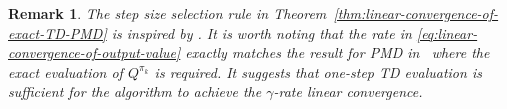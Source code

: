 \documentclass[10pt]{article}
\theoremstyle{plain}
\newtheorem{remark}{Remark}[section]
\theoremstyle{definition}
\begin{document}
\begin{remark}
The step size selection rule in Theorem~\ref{thm:linear-convergence-of-exact-TD-PMD} is inspired by  \textup{\cite{Johnson_Pike-Burke_Rebeschini_2023}}. It is worth noting that the rate in \eqref{eq:linear-convergence-of-output-value}  exactly matches the result for  PMD in~\textup{\cite{Johnson_Pike-Burke_Rebeschini_2023}} where the exact evaluation of $Q^{\pi_k}$ is required. It suggests that one-step TD evaluation is  sufficient for the algorithm to achieve the $\gamma$-rate linear convergence.
\end{remark}
\end{document}
